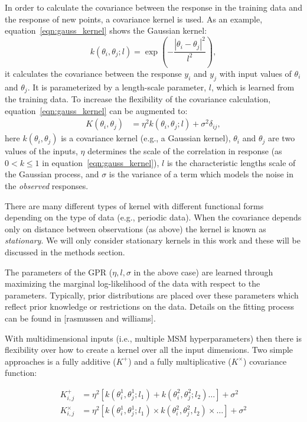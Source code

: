 \documentclass[journal=jacsat,manuscript=article]{achemso}
\begin{document}
In order to calculate the covariance between the response in the training data and the response of new points, a covariance kernel is used. As an example, equation~\ref{eqn:gauss_kernel} shows the Gaussian kernel: 
\begin{equation}
    k(\theta_i, \theta_j; l) =  \exp\left(-\frac{\left|\theta_i-\theta_j\right|^2}{l^2}\right), \label{eqn:gauss_kernel}
\end{equation}
it calculates the covariance between the response $y_i$ and $y_j$ with input values of $\theta_i$ and $\theta_j$. It is parameterized by a length-scale parameter, $l$, which is learned from the training data. To increase the flexibility of the covariance calculation, equation~\ref{eqn:gauss_kernel} can be augmented to: 
\begin{align}
    K(\theta_i, \theta_j) & = \eta^2  k(\theta_i, \theta_j; l) + \sigma^2\delta_{ij}, 
\end{align}
here $k(\theta_i, \theta_j)$ is a covariance kernel (e.g., a Gaussian kernel),  $\theta_i$ and $\theta_j$ are two values of the inputs, $\eta$ determines the scale of the correlation in response (as $0<k\le 1$ in equation~\ref{eqn:gauss_kernel}), $l$ is the characteristic lengths scale of the Gaussian process, and $\sigma$ is the variance of a term which models the noise in the \emph{observed} responses. 

There are many different types of kernel with different functional forms depending on the type of data (e.g., periodic data). When the covariance depends only on distance between observations (as above) the kernel is known as \emph{stationary}.  We will only consider stationary kernels in this work and these will be discussed in the methods section. 

The parameters of the GPR ($\eta, l, \sigma$ in the above case) are learned through maximizing the marginal log-likelihood of the data with respect to the parameters. Typically, prior distributions are placed over these parameters which reflect prior knowledge or restrictions on the data. Details on the fitting process can be found in [rasmussen and williams]. 

With multidimensional inputs (i.e., multiple MSM hyperparameters) then there is flexibility over how to create a kernel over all the input dimensions. Two simple approaches is a fully additive ($K^{\mathrm{+}}$) and a fully multiplicative ($K^{\mathrm{\times}}$) covariance function: 

\begin{align}
    K^{\mathrm{+}}_{i,j} & = \eta^2  \left [k(\theta^{1}_i, \theta^{1}_j; l_{1}) + k(\theta^{2}_i, \theta^{2}_j; l_{2}) \ldots \right ] + \sigma^2  \label{eqn:plus_kernel} \\ 
    K^{\mathrm{\times}}_{i,j} & = \eta^2  \left [k(\theta^{1}_i, \theta^{1}_j; l_{1}) \times k(\theta^{2}_i, \theta^{2}_j, l_{2}) \times \ldots \right ] + \sigma^2 \label{eqn:mult_kernel}
\end{align}
\end{document}
